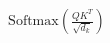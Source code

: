 \documentclass[preview]{standalone}
\begin{document}
\begin{align*}
\text{Softmax}\left(\frac{Q K^T}{\sqrt{d_k}}\right)
\end{align*}
\end{document}
